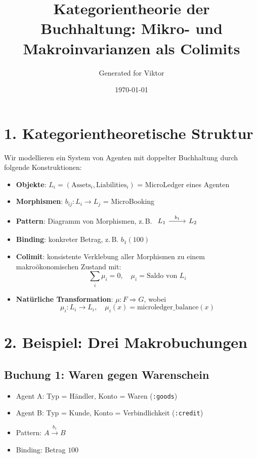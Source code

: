 \documentclass{article}
\title{Kategorientheorie der Buchhaltung: Mikro- und Makroinvarianzen als Colimits}
\author{Generated for Viktor}
\date{\today}
\begin{document}
\maketitle

\section*{1. Kategorientheoretische Struktur}

Wir modellieren ein System von Agenten mit doppelter Buchhaltung durch folgende Konstruktionen:

\begin{itemize}
  \item \textbf{Objekte}: \( L_i = (\text{Assets}_i, \text{Liabilities}_i) \) = MicroLedger eines Agenten
  \item \textbf{Morphismen}: \( b_{ij}: L_i \to L_j \) = MicroBooking
  \item \textbf{Pattern}: Diagramm von Morphismen, z.\,B.\quad
    \(\begin{tikzcd} L_1 \arrow[r, "b_1"] & L_2 \end{tikzcd}\)
  \item \textbf{Binding}: konkreter Betrag, z.\,B. \( b_1(100) \)
  \item \textbf{Colimit}: konsistente Verklebung aller Morphismen zu einem makroökonomischen Zustand mit:
    \[
      \sum_i \mu_i = 0, \quad \mu_i = \text{Saldo von } L_i
    \]
  \item \textbf{Natürliche Transformation}: \( \mu: F \Rightarrow G \), wobei
    \[
      \mu_i: L_i \to L_i, \quad \mu_i(x) = \text{microledger\_balance}(x)
    \]
\end{itemize}

\section*{2. Beispiel: Drei Makrobuchungen}

\subsection*{Buchung 1: Waren gegen Warenschein}

\begin{itemize}
  \item Agent A: Typ = Händler, Konto = Waren (\texttt{:goods})
  \item Agent B: Typ = Kunde, Konto = Verbindlichkeit (\texttt{:credit})
  \item Pattern: \( A \xrightarrow{b_1} B \)
  \item Binding: Betrag \( 100 \)
\end{itemize}
\end{document}
